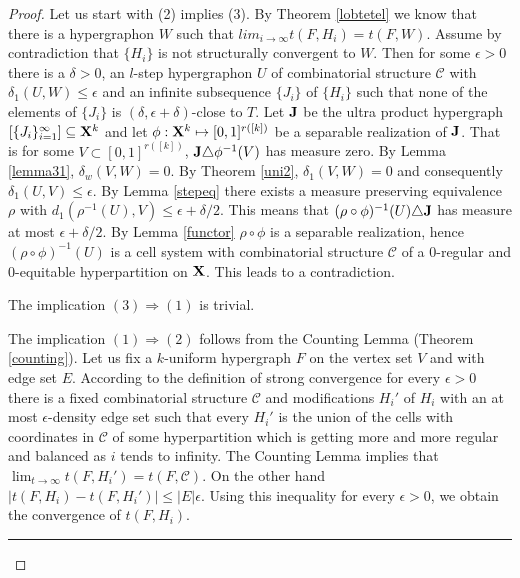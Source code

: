 \documentclass [11pt] {article}
\newcommand{\qed} {\hspace {0.1in} \rule {1.5mm} {3.5mm}}
\def\to{\rightarrow}
\def\xo{{\bf X}}
\begin{document}
\begin{proof} Let us start with (2) implies (3).
By Theorem \ref{lobtetel} we know that there is a hypergraphon $W$ such 
that $lim_{i\to\infty} t(F,H_i)=t(F,W)$.
Assume by contradiction that $\{H_i\}$ is not structurally
 convergent to $W$. Then for some $\epsilon>0$ there is a $\delta>0$, an
 $l$-step 
hypergraphon $U$ of combinatorial structure $\mathcal{C}$ with
 $\delta_1(U,W)\leq\epsilon$ and an infinite subsequence $\{J_i\}$ of
 $\{H_i\}$ 
such that none of the elements of $\{J_i\}$ is 
$(\delta,\epsilon+\delta)$-close to $T$. Let ${\bf J}$ be the ultra product
hypergraph $[\{J_i\}_{i=1}^\infty]\subseteq\xo^k$ and 
let $\phi:\xo^k\mapsto[0,1]^{r([k])}$ be a separable
 realization of ${\bf J}$. That is for some $V\subset [0,1]^{r([k])}$,
${\bf J}\triangle \phi^{-1}(V)$ has measure zero. By Lemma \ref{lemma31},
$\delta_w(V,W)=0$.
By Theorem \ref{uni2}, $\delta_1(V,W)=0$ and consequently 
$\delta_1(U,V)\leq\epsilon$. By Lemma \ref{stepeq} there exists a measure preserving
equivalence $\rho$ with $d_1(\rho^{-1}(U),V)\leq\epsilon+\delta/2$. 
This means that $(\rho\circ\phi)^{-1}(U)\triangle{\bf J}$ has measure 
at most $\epsilon+\delta/2$.
By Lemma \ref{functor} $\rho\circ\phi$ is a separable realization, hence 
$(\rho\circ\phi)^{-1}(U)$ is a cell system with combinatorial 
structure $\mathcal{C}$ of a $0$-regular and $0$-equitable 
hyperpartition on $\xo$. This leads to a contradiction.

The implication $(3)\Rightarrow(1)$ is trivial.

The implication $(1)\Rightarrow(2)$ follows 
from the Counting Lemma (Theorem \ref{counting}). 
Let us fix a $k$-uniform hypergraph $F$ on the 
vertex set $V$ and with edge set $E$. According to 
the definition of strong convergence for every $\epsilon>0$ there is a fixed
combinatorial structure $\mathcal{C}$ and modifications 
$H_i'$ of $H_i$ with an at most $\epsilon$-density 
edge set such that every $H_i'$ is the union of the 
cells with coordinates in $\mathcal{C}$ of some hyperpartition which is
getting more and more regular and balanced as $i$ tends to infinity.
The Counting Lemma implies that 
$\lim_{t\to\infty}t(F,H_i')=t(F,\mathcal{C})$. 
On the other hand $|t(F,H_i)-t(F,H_i')|\leq |E|\epsilon$.
 Using this inequality for every $\epsilon>0$, we obtain the convergence of
 $t(F,H_i)$. \qed
\end{proof}
\end{document}
